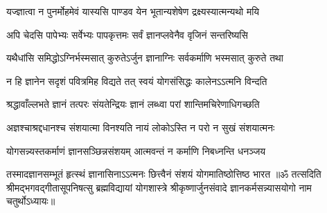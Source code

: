 \twolineshloka
{यज्ज्ञात्वा न पुनर्मोहमेवं यास्यसि पाण्डव}
{येन भूतान्यशेषेण द्रक्ष्यस्यात्मन्यथो मयि}%

\twolineshloka
{अपि चेदसि पापेभ्यः सर्वेभ्यः पापकृत्तमः}
{सर्वं ज्ञानप्लवेनैव वृजिनं सन्तरिष्यसि}%

\twolineshloka
{यथैधांसि समिद्धोऽग्निर्भस्मसात् कुरुतेऽर्जुन}
{ज्ञानाग्निः सर्वकर्माणि भस्मसात् कुरुते तथा}%

\twolineshloka
{न हि ज्ञानेन सदृशं पवित्रमिह विद्यते}
{तत् स्वयं योगसंसिद्धः कालेनऽऽत्मनि विन्दति}%

\twolineshloka
{श्रद्धावाँल्लभते ज्ञानं तत्परः संयतेन्द्रियः}
{ज्ञानं लब्ध्वा परां शान्तिमचिरेणाधिगच्छति}%

\twolineshloka
{अज्ञश्चाश्रद्दधानश्च संशयात्मा विनश्यति}
{नायं लोकोऽस्ति न परो न सुखं संशयात्मनः}%

\twolineshloka
{योगसन्न्यस्तकर्माणं ज्ञानसञ्छिन्नसंशयम्}
{आत्मवन्तं न कर्माणि निबध्नन्ति धनञ्जय}%

\twolineshloka
{तस्मादज्ञानसम्भूतं हृत्स्थं ज्ञानासिनाऽऽत्मनः}
{छित्त्वैनं संशयं योगमातिष्ठोत्तिष्ठ भारत}%
{॥ॐ तत्सदिति श्रीमद्भगवद्गीतासूपनिषत्सु ब्रह्मविद्यायां योगशास्त्रे श्रीकृष्णार्जुनसंवादे ज्ञानकर्मसन्न्यासयोगो नाम चतुर्थोऽध्यायः॥}